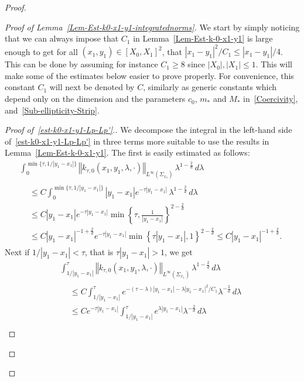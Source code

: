 \documentclass[AHL,Unicode,longabstracts]{cedram}
\newcommand{\norm}[1]{\left\Vert#1\right\Vert}
\renewcommand{\leq}{\leqslant}
\renewcommand{\geq}{\geqslant}
\begin{document}
\begin{proof}
\begin{proof}[Proof of Lemma~\ref{Lem-Est-k0-x1-y1-integratednorms}]
We start by simply noticing that we can always impose that $C_1$ in Lemma~\ref{Lem-Est-k-0-x1-y1} is large enough to get for all $(x_1, y_1) \in [X_0, X_1]^2$, that $|x_1 - y_1|^2/C_1 \leq |x_1 - y_1|/4$. This can be done by assuming for instance $C_1 \geq 8$ since $|X_0|, |X_1| \leq 1$. This will make some of the estimates below easier to prove properly. For convenience, this constant $C_1$ will next be denoted by $C$, similarly as generic constants which depend only on the dimension and the parameters $c_0$, $m_*$ and $M_*$ in~\eqref{Coercivity}, and~\eqref{Sub-ellipticity-Strip}.

\begin{proof}[{Proof of~\eqref{est-k0-x1-y1-Lp-Lp'}.}]
We decompose the integral in the left-hand side of~\eqref{est-k0-x1-y1-Lp-Lp'} in three terms more suitable to use the results in Lemma~\ref{Lem-Est-k-0-x1-y1}. The first is easily estimated as follows:
\begin{multline*}
\int_{0}^{ \min\{ \tau, 1/|y_1-x_1|\} } \norm{k_{\tau,0}(x_1, y_1, \lambda, \cdot) }_{L^\infty\left(\Sigma_{x_1}\right)} \, \lambda^{1 -\frac{2}{d}}\, d\lambda\\
\begin{aligned}
& \leq C \int_{0}^{ \min\{ \tau, 1/|y_1-x_1|\} } |y_1-x_1| e^{-\tau |y_1 -x_1|} \, \lambda^{1 -\frac{2}{d}}\, d\lambda
\\
&
\leq C |y_1-x_1| e^{-\tau |y_1 -x_1|} \min\left\{ \tau, \frac{1}{|y_1-x_1|}\right\}^{2 - \frac{2}{d}}
\\
&
\leq C |y_1-x_1|^{-1+\frac{2}{d}} e^{-\tau |y_1 -x_1|} \min\left\{ \tau |y_1 -x_1|, 1\right\}^{2 - \frac{2}{d}}
\leq C |y_1-x_1|^{-1+\frac{2}{d}}.
\end{aligned}
\end{multline*}
Next if $1/|y_1 -x _1| < \tau$, that is $\tau |y_1 - x_1| > 1$, we get
\begin{multline*}
\int_{ 1/|y_1-x_1|}^{ \tau } \norm{k_{\tau,0}(x_1, y_1, \lambda, \cdot) }_{L^\infty\left(\Sigma_{x_1}\right)} \, \lambda^{1 -\frac{2}{d}}\, d\lambda \\
\begin{aligned}
&\leq C \int_{ 1/|y_1-x_1|}^{ \tau } e^{-(\tau - \lambda)|y_1 -x_1|- \lambda |y_1-x_1|^2/C_1} \lambda^{ -\frac{2}{d}}\, d\lambda
\\
& \leq C e^{-\tau |y_1-x_1|}\int_{1/|y_1 -x_1|}^{\tau} e^{\lambda |y_1-x_1|} \lambda^{-\frac{2}{d}} \, d \lambda
\\

\end{aligned}
\end{multline*}
\end{proof}
\end{proof}
\end{proof}
\end{document}
